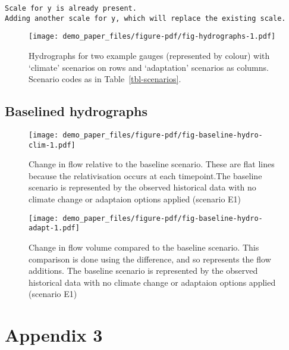 \documentclass[
  number]{elsarticle}
\begin{document}
\begin{verbatim}
Scale for y is already present.
Adding another scale for y, which will replace the existing scale.
\end{verbatim}

\begin{figure}

{\centering \texttt{[image: demo\_paper\_files/figure-pdf/fig-hydrographs-1.pdf]}

}

\caption{\label{fig-hydrographs}Hydrographs for two example gauges
(represented by colour) with `climate' scenarios on rows and
`adaptation' scenarios as columns. Scenario codes as in
Table~\ref{tbl-scenarios}.}

\end{figure}

\hypertarget{sec-baselining}{%
\subsection{Baselined hydrographs}\label{sec-baselining}}

\begin{figure}

{\centering \texttt{[image: demo\_paper\_files/figure-pdf/fig-baseline-hydro-clim-1.pdf]}

}

\caption{\label{fig-baseline-hydro-clim}Change in flow relative to the
baseline scenario. These are flat lines because the relativisation
occurs at each timepoint.The baseline scenario is represented by the
observed historical data with no climate change or adaptaion options
applied (scenario E1)}

\end{figure}

\begin{figure}

{\centering \texttt{[image: demo\_paper\_files/figure-pdf/fig-baseline-hydro-adapt-1.pdf]}

}

\caption{\label{fig-baseline-hydro-adapt}Change in flow volume compared
to the baseline scenario. This comparison is done using the difference,
and so represents the flow additions. The baseline scenario is
represented by the observed historical data with no climate change or
adaptaion options applied (scenario E1)}

\end{figure}

\hypertarget{sec-causalnetwork-versions}{%
\section{Appendix 3}\label{sec-causalnetwork-versions}}
\end{document}
